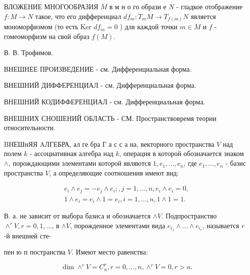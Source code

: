 \documentclass[10pt]{article}
\begin{document}
ВЛОЖЕНИЕ МНОГООБРАЗИЯ $M$ в м н о го образи е $N$ - гладкое отображение $f: M \rightarrow N$ такое, что его дифференциал $d f_{m}: T_{m} M \rightarrow T_{f(m)} N$ является мономорфизмом (то есть Ker $d f_{m}=0$ ) для каждой точки $m \in M$ и $f$ - гомеоморфизм на свой образ $f(M)$.



В. В. Трофимов.



ВНЕШНЕЕ ПРОИЗВЕДЕНИЕ - см. Дифференциальная форма.



ВНЕШНИЙ ДИФФЕРЕНЦИАЛ - см. Дифференциальная форма.



ВНЕШНИЙ КОДИФФЕРЕНЦИАЛ - см. Дифференциальная форма.



ВНЕШНИХ СНОШЕНИЙ ОБЛАСТЬ - СМ. Пространствовремя теории относительности.



BНЕШнЯЯ AЛГЕБРА, ал ге бра Г а с с а на, векторного пространства $V$ над полем $k$ - ассоциативная алгебра над $k$, операция в которой обозначается знаком $\wedge$, порождающими элементами которой являются $1, e_{1}, \ldots, e_{n}$, где $e_{1}, \ldots, e_{n}$ - базис пространства $V$, а определяющие соотношения имеют вид:



\[

\begin{gathered}

e_{i} \wedge e_{j}=-e_{j} \wedge e_{i} ;, j=1, \ldots, n, e_{i} \wedge e_{i}=0, \\

1 \wedge e_{i}=e_{i} \wedge 1=e_{i}, i=1, \ldots, n, 1 \wedge 1=1 .

\end{gathered}

\]



В. а. не зависит от выбора базиса и обозначается $\wedge V$. Подпространство $\wedge^{r} V, r=0,1, \ldots$, в $\wedge V$, порожденное элементами вида $e_{i_{1}} \wedge \ldots \wedge e_{i_{r}}$, называется $r$-й внешней сте-



пен ю п постранства $V$. Имеют место равенства:



\[

\operatorname{dim} \wedge^{r} V=C_{n}^{r}, r=0, \ldots, n, \wedge^{r} V=0, r>n .

\]
\end{document}
